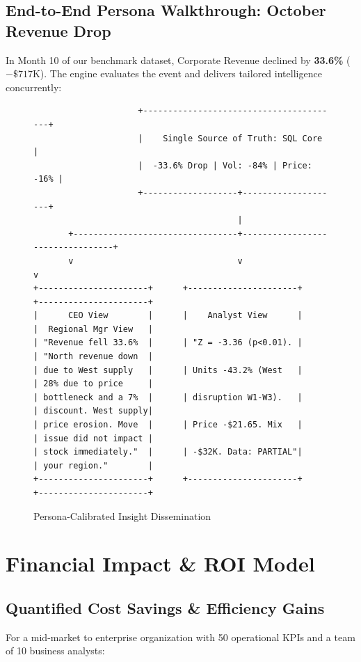 \documentclass[11pt,a4paper]{article}
\begin{document}
\subsection{End-to-End Persona Walkthrough: October Revenue Drop}
In Month 10 of our benchmark dataset, Corporate Revenue declined by \textbf{33.6\%} ($-\$717\text{K}$). The engine evaluates the event and delivers tailored intelligence concurrently:

\begin{figure}[h!]
\centering
\footnotesize
\begin{verbatim}
                     +----------------------------------------+
                     |    Single Source of Truth: SQL Core    |
                     |  -33.6% Drop | Vol: -84% | Price: -16% |
                     +-------------------+--------------------+
                                         |
       +---------------------------------+---------------------------------+
       v                                 v                                 v
+----------------------+      +----------------------+      +----------------------+
|      CEO View        |      |    Analyst View      |      |  Regional Mgr View   |
| "Revenue fell 33.6%  |      | "Z = -3.36 (p<0.01). |      | "North revenue down  |
| due to West supply   |      | Units -43.2% (West   |      | 28% due to price     |
| bottleneck and a 7%  |      | disruption W1-W3).   |      | discount. West supply|
| price erosion. Move  |      | Price -$21.65. Mix   |      | issue did not impact |
| stock immediately."  |      | -$32K. Data: PARTIAL"|      | your region."        |
+----------------------+      +----------------------+      +----------------------+
\end{verbatim}
\caption{Persona-Calibrated Insight Dissemination}
\end{figure}

\newpage
\section{Financial Impact \& ROI Model}

\subsection{Quantified Cost Savings \& Efficiency Gains}
For a mid-market to enterprise organization with 50 operational KPIs and a team of 10 business analysts:
\end{document}
